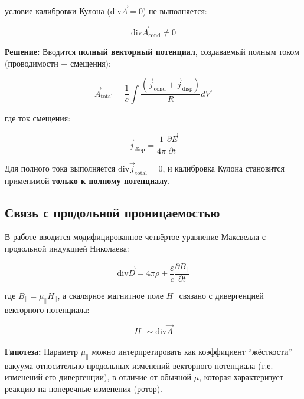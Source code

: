 \documentclass[12pt, a4paper]{article}
\begin{document}
условие калибровки Кулона ($\text{div} \vec{A} = 0$) не выполняется:

\begin{equation}
\text{div} \vec{A}_{\text{cond}} \neq 0
\label{eq:divergence_error}
\end{equation}

\textbf{Решение:} Вводится \textbf{полный векторный потенциал}, создаваемый полным током (проводимости + смещения):

\begin{equation}
\vec{A}_{\text{total}} = \frac{1}{c} \int \frac{(\vec{j}_{\text{cond}} + \vec{j}_{\text{disp}})}{R} dV'
\label{eq:vector_potential_total}
\end{equation}

где ток смещения:

\begin{equation}
\vec{j}_{\text{disp}} = \frac{1}{4\pi} \frac{\partial \vec{E}}{\partial t}
\label{eq:displacement_current}
\end{equation}

Для полного тока выполняется $\text{div} \vec{j}_{\text{total}} = 0$, и калибровка Кулона становится применимой \textbf{только к полному потенциалу}.

\subsection{Связь с продольной проницаемостью}

В работе \cite{NikolaevLorentz} вводится модифицированное четвёртое уравнение Максвелла с продольной индукцией Николаева:

\begin{equation}
\text{div} \vec{D} = 4\pi\rho + \frac{\varepsilon}{c} \frac{\partial B_{\parallel}}{\partial t}
\label{eq:nikolaev_equation}
\end{equation}

где $B_{\parallel} = \mu_{\parallel} H_{\parallel}$, а скалярное магнитное поле $H_{\parallel}$ связано с дивергенцией векторного потенциала:

\begin{equation}
H_{\parallel} \sim \text{div} \vec{A}
\label{eq:longitudinal_h}
\end{equation}

\textbf{Гипотеза:} Параметр $\mu_{\parallel}$ можно интерпретировать как коэффициент ``жёсткости'' вакуума относительно продольных изменений векторного потенциала (т.е. изменений его дивергенции), в отличие от обычной $\mu$, которая характеризует реакцию на поперечные изменения (ротор).
\end{document}
